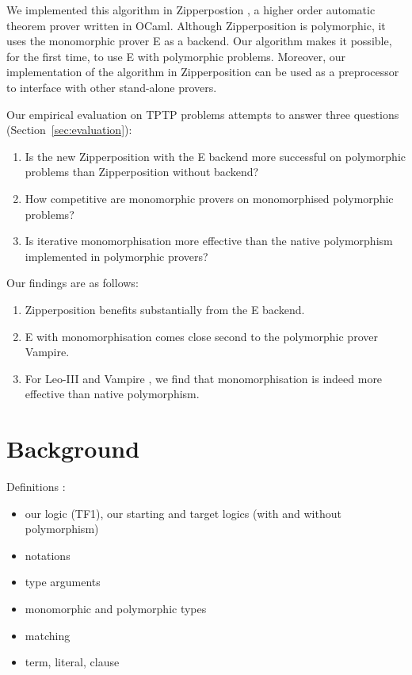 \documentclass[]{ceurart}
\begin{document}
\bigskip

We implemented this algorithm in Zipperpostion \cite{zipp}, a higher order automatic theorem prover written in OCaml. Although Zipperposition is polymorphic, it uses the monomorphic prover E \cite{e} as a backend. Our algorithm makes it possible, for the first time, to use E with polymorphic problems. Moreover, our implementation of the algorithm in Zipperposition can be used as a preprocessor to interface with other stand-alone provers.

Our empirical evaluation on TPTP problems \cite{tptp} attempts to answer three questions (Section~\ref{sec:evaluation}):
%
\begin{enumerate}
\item Is the new Zipperposition with the E backend more successful on polymorphic problems than Zipperposition without backend?

\item How competitive are monomorphic provers on monomorphised polymorphic problems?

\item Is iterative monomorphisation more effective than the native polymorphism implemented in polymorphic provers?
\end{enumerate}

Our findings are as follows:
%
\begin{enumerate}
\item Zipperposition benefits substantially from the E backend.

\item E with monomorphisation comes close second to the polymorphic prover Vampire.

\item For Leo-III \cite{leo-iii} and Vampire \cite{vamp}, we find that monomorphisation is indeed more effective than native polymorphism.
\end{enumerate}

\section{Background}
\label{sec:background}

Definitions :
\begin{itemize}
   \item our logic (TF1), our starting and target logics (with and without polymorphism)
   \item notations
   \item type arguments
   \item monomorphic and polymorphic types
   \item matching 
   \item term, literal, clause 
\end{itemize}
\end{document}
